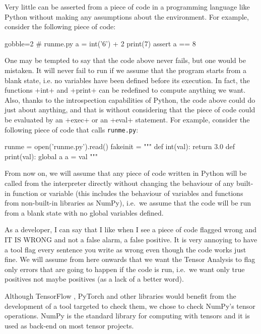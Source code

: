 Very little can be asserted from a piece of code in a programming language like Python
without making any assumptions about the environment. For example, consider the following
piece of code:

\begin{pythoncode*}{gobble=2}
  # runme.py
  a = int('6') + 2
  print(7)
  assert a == 8
\end{pythoncode*}

One may be tempted to say that the code above never fails, but one would be mistaken.  It
will never fail to run if we assume that the program starts from a blank state, i.e. no
variables have been defined before its execution. In fact, the functions \pycode+int+ and
\pycode+print+ can be redefined to compute anything we want. Also, thanks to the
introspection capabilities of Python, the code above could do just about anything, and
that is without considering that the piece of code could be evaluated by an \pycode+exec+
or an \pycode+eval+ statement. For example, consider the following piece of code that
calls \texttt{runme.py}:

\begin{pythoncode}
  runme = open('runme.py').read()
  fakeinit = """
  def int(val):
    return 3.0
  def print(val):
    global a
    a = val
  """
\end{pythoncode}

From now on, we will assume that any piece of code written in Python will be called from
the interpreter directly without changing the behaviour of any built-in function or
variable (this includes the behaviour of variables and functions from non-built-in
libraries as NumPy), i.e.~we assume that the code will be run from a blank state with no
global variables defined.

As a developer, I can say that I like when I see a piece of code flagged wrong and IT IS
WRONG and not a false alarm, a false positive. It is very annoying to have a tool flag
every sentence you write as wrong even though the code works just fine. We will assume
from here onwards that we want the Tensor Analysis to flag only errors that are going to
happen if the code is run, i.e.~we want only true positives not maybe positives (as a lack
of a better word).

Although TensorFlow \autocite{abadi_tensorflow_2016}, PyTorch
\autocite{paszke2017pytorch} and other libraries would benefit from the development of a
tool targeted to check them, we chose to check NumPy's tensor operations. NumPy is the
standard library for computing with tensors and it is used as back-end on most tensor
projects.

